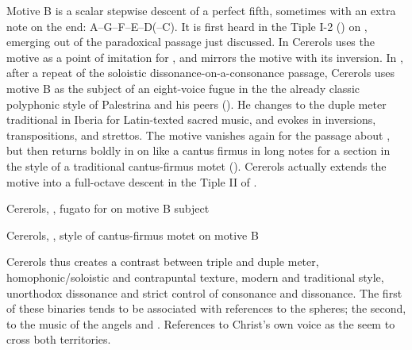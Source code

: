 Motive B is a scalar stepwise descent of a perfect fifth, sometimes with an
extra note on the end: A--G--F--E--D(--C\sh). 
It is first heard in the Tiple I-2 () on ,
emerging out of the paradoxical passage just discussed.
In  Cererols uses the motive as a point of imitation for
, and mirrors the motive with its
inversion.
In , after a repeat of the soloistic dissonance-on-a-consonance
passage, Cererols uses motive B as the subject of an eight-voice fugue in the
the already classic polyphonic style of Palestrina and his peers
().
He changes to the duple meter traditional in Iberia for Latin-texted sacred
music, and evokes  in inversions, transpositions,
and strettos.  
The motive vanishes again for the passage about , but then 
returns boldly in  on  like a
 cantus firmus in long notes for a section in the style of
a traditional cantus-firmus motet
().
Cererols actually extends the motive into a full-octave descent in the Tiple II
of .


\begin{musicexample}
    \caption{Cererols, , fugato  for
     on motive B subject}
    \label{mus:Cererols-Suspended-contrapunto_celestial}
\end{musicexample}

\begin{musicexample}
    \caption{Cererols, , style of cantus-firmus
    motet on motive B} 
    \label{mus:Cererols-Suspended-canto_llano}
\end{musicexample}

Cererols thus creates a contrast between triple and duple meter,
homophonic/soloistic and contrapuntal texture, modern and traditional style,
unorthodox dissonance and strict control of consonance and dissonance.
The first of these binaries tends to be associated with references to the
spheres; the second, to the music of the angels and . 
References to Christ's own voice as the  seem to cross both
territories.

